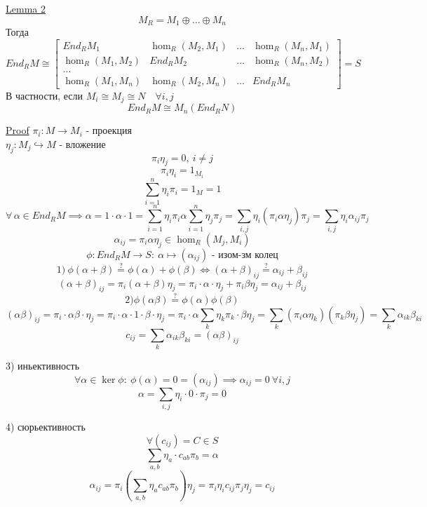 \documentclass[a4paper]{article}
\begin{document}
\begin{tcolorbox}
\underline{Lemma 2}
\[
    M_R = M_1 \oplus \dots \oplus M_n
\]
Тогда
\[
    End_R M \cong 
    \begin{bmatrix}
        End_R M_1 & \hom_R(M_2, M_1) & \hdots & \hom_R(M_n, M_1)\\
        \hom_R(M_1, M_2) & End_R M_2 & \hdots & \hom_R(M_n, M_2)\\
        \dots\\
        \hom_R(M_1, M_n) & \hom_R(M_2, M_n) & \dots & End_R M_n
    \end{bmatrix}
    = S
\]
В частности, если $ M_i \cong M_j \cong N \quad \forall i, j $ 
\[
    End_R M \cong M_n(End_R N)
\]

\underline{Proof} $ \pi_i: M \to M_i $ - проекция\\
$ \eta_j: M_j \hookrightarrow M $ - вложение
\[
    \pi_i \eta_j = 0, \ i \neq j
\]
\[
    \pi_i \eta_i = 1_{M_i}
\]
\[
    \sum_{i=1}^{n} \eta_i \pi_i = 1_M = 1
\]
\[
    \forall \, \alpha \in End_R M \implies \alpha = 1 \cdot \alpha \cdot 1 =
    \sum_{i=1}^{n} \eta_i \pi_i \alpha \sum_{i=1}^{n} \eta_j \pi_j =
    \sum_{i,j} \eta_i(\pi_i \alpha \eta_j) \pi_j = \sum_{i,j} \eta_i \alpha_{ij}
    \pi_j
\]
\[
    \alpha_{ij} = \pi_i \alpha \eta_j \in \hom_R(M_j, M_i)
\]
\[
    \phi: End_R M \to S: \ \alpha \mapsto (\alpha_{ij}) \text{ - изом-зм колец}
\]
\[
    1) \ \phi(\alpha + \beta) \stackrel{?}{=} \phi(\alpha) + \phi(\beta) 
    \iff (\alpha + \beta)_{ij} \stackrel{?}{=} \alpha_{ij} + \beta_{ij}
\]
\[
    (\alpha + \beta)_{ij} = \pi_i (\alpha + \beta) \eta_j = \pi_i \cdot \alpha
    \cdot \eta_j + \pi_i \beta \eta_j = \alpha_{ij} + \beta_{ij}
\]
\[
    2) \phi(\alpha \beta) \stackrel{?}{=} \phi(\alpha) \phi(\beta)
\]
\[
    (\alpha \beta)_{ij} = \pi_i \cdot \alpha \beta \cdot \eta_j = \pi_i \cdot
    \alpha \cdot 1 \cdot \beta \cdot \eta_j = \pi_i \cdot \alpha \sum_{k} \eta_k
    \pi_k \cdot \beta \eta_j = \sum_{k} (\pi_i \alpha \eta_k)(\pi_k \beta \eta_j)
    = \sum_{k} \alpha_{ik} \beta_{ki}
\]
\[
    c_{ij} = \sum_{k} \alpha_{ik} \beta_{ki} = (\alpha \beta)_{ij}
\]

3) иньективность
\[
    \forall \alpha \in \ker \phi: \ \phi(\alpha) = 0 = (\alpha_{ij}) \implies 
    \alpha_{ij} = 0 \ \forall i,j
\]
\[
    \alpha = \sum_{i,j} \eta_i \cdot 0 \cdot \pi_j = 0
\]

4) сюрьективность
\[
    \forall (c_{ij}) = C \in S
\]
\[
    \sum_{a,b} \eta_a \cdot c_{ab} \pi_b = \alpha
\]
\[
    \alpha_{ij} = \pi_i \left(\sum_{a,b} \eta_a c_{ab}\pi_b \right) \eta_j
    = \pi_i \eta_i c_{ij} \pi_j \eta_j = c_{ij}
\]
\end{tcolorbox}
\end{document}
